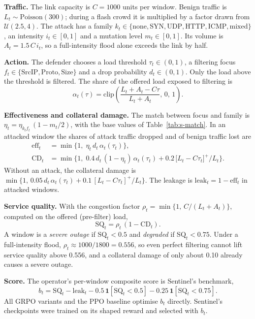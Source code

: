 \documentclass[10pt,journal,onecolumn]{IEEEtran}
\begin{document}
\textbf{Traffic.} The link capacity is $C=1000$ units per window. Benign traffic is $L_t\sim\mathrm{Poisson}(300)$; during a flash crowd it is multiplied by a factor drawn from $\mathcal{U}(2.5,4)$. The attack has a family $k_t\in\{\text{none},\text{SYN},\text{UDP},\text{HTTP},\text{ICMP},\text{mixed}\}$, an intensity $i_t\in[0,1]$ and a mutation level $m_t\in[0,1]$. Its volume is $A_t=1.5\,C\,i_t$, so a full-intensity flood alone exceeds the link by half.

\textbf{Action.} The defender chooses a load threshold $\tau_t\in(0,1)$, a filtering focus $f_t\in\{\text{SrcIP},\text{Proto},\text{Size}\}$ and a drop probability $d_t\in(0,1)$. Only the load above the threshold is filtered. The share of the offered load exposed to filtering is
\begin{equation}
\alpha_t(\tau)=\mathrm{clip}\!\left(\frac{L_t+A_t-C\tau}{L_t+A_t},\,0,\,1\right).
\end{equation}

\textbf{Effectiveness and collateral damage.} The match between focus and family is $\eta_t=\eta_{k_t f_t}\,(1-m_t/2)$, with the base values of Table~\ref{tab:s-match}. In an attacked window the shares of attack traffic dropped and of benign traffic lost are
\begin{align}
\mathrm{eff}_t &= \min\{1,\;\eta_t\,d_t\,\alpha_t(\tau_t)\},\\
\mathrm{CD}_t &= \min\Big\{1,\;0.4\,d_t\,(1-\eta_t)\,\alpha_t(\tau_t)+0.2\,\big[L_t-C\tau_t\big]^+/L_t\Big\}. \label{eq:s-cd}
\end{align}
Without an attack, the collateral damage is $\min\{1,\,0.05\,d_t\,\alpha_t(\tau_t)+0.1\,[L_t-C\tau_t]^+/L_t\}$. The leakage is $\mathrm{leak}_t=1-\mathrm{eff}_t$ in attacked windows.

\textbf{Service quality.} With the congestion factor $\rho_t=\min\{1,\,C/(L_t+A_t)\}$, computed on the offered (pre-filter) load,
\begin{equation}
\mathrm{SQ}_t=\rho_t\,(1-\mathrm{CD}_t). \label{eq:s-sq}
\end{equation}
A window is a \emph{severe outage} if $\mathrm{SQ}_t<0.5$ and \emph{degraded} if $\mathrm{SQ}_t<0.75$. Under a full-intensity flood, $\rho_t\approx1000/1800=0.556$, so even perfect filtering cannot lift service quality above 0.556, and a collateral damage of only about 0.10 already causes a severe outage.

\textbf{Score.} The operator's per-window composite score is Sentinel's benchmark,
\begin{equation}
b_t=\mathrm{SQ}_t-\mathrm{leak}_t-0.5\,\mathbf{1}[\mathrm{SQ}_t<0.5]-0.25\,\mathbf{1}[\mathrm{SQ}_t<0.75].
\end{equation}
All GRPO variants and the PPO baseline optimise $b_t$ directly. Sentinel's checkpoints were trained on its shaped reward and selected with $b_t$.
\end{document}
